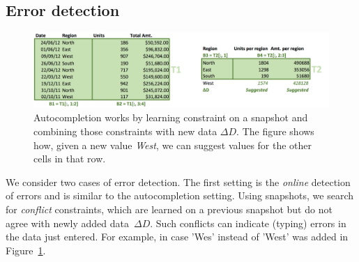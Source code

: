 
\subsection{Error detection}
\begin{figure}[t]
\begin{center}
    \includegraphics[width=1.0\linewidth]{figures/Learning.png}
  \end{center}
  \caption{Autocompletion works by learning constraint on a snapshot and combining those constraints with new data $\Delta D$.
  The figure shows how, given a new value \textit{West}, we can suggest values for the other cells in that row.}
  \label{fig:autocompletion_example}
\end{figure}

We consider two cases of error detection.
The first setting is the \textit{online} detection of errors and is similar to the autocompletion setting.
Using snapshots, we search for \textit{conflict} constraints, which are learned on a previous snapshot but do not agree with newly added data~$\Delta D$.
Such conflicts can indicate (typing) errors in the data just entered. For example, in case 'Wes' instead of 'West' was added in Figure~\ref{fig:autocompletion_example}.

